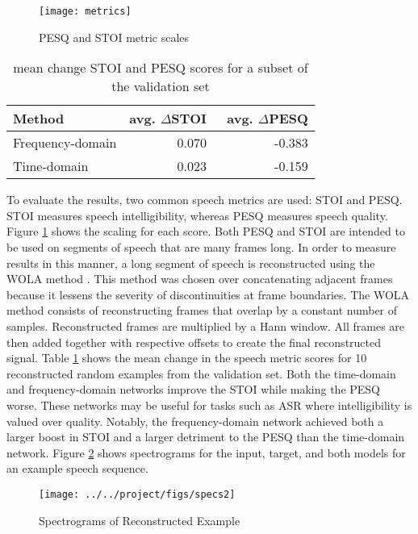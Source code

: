 \begin{figure}
	\centering
	\texttt{[image: metrics]}
	\caption{\ac{PESQ} and \ac{STOI} metric scales}
	\label{fig:metrics}
\end{figure}

\begin{table}
	\centering
	\caption{mean change STOI and PESQ scores for a subset of the validation set}
	\label{tab:results}
	\resizebox{0.5\textwidth}{!} {
	\begin{tabular}{lrr}
	\toprule
			  Method &  avg. $\Delta$STOI &  \ avg. $\Delta$PESQ \\
	\midrule
	Frequency-domain &         0.070 &        -0.383 \\
		 Time-domain &         0.023 &        -0.159 \\
	\bottomrule
	\end{tabular}
	}
\end{table}

To evaluate the results, two common speech metrics are used: \ac{STOI} and \ac{PESQ}. \ac{STOI} measures speech intelligibility, whereas \ac{PESQ} measures speech quality. Figure \ref{fig:metrics} shows the scaling for each score. Both \ac{PESQ} and \ac{STOI} are intended to be used on segments of speech that are many frames long. In order to measure results in this manner, a long segment of speech is reconstructed using the \ac{WOLA} method . This method was chosen over concatenating adjacent frames because it lessens the severity of discontinuities at frame boundaries. The \ac{WOLA} method consists of reconstructing frames that overlap by a constant number of samples. Reconstructed frames are multiplied by a Hann window. All frames are then added together with respective offsets to create the final reconstructed signal. Table \ref{tab:results} shows the mean change in the speech metric scores for 10 reconstructed random  examples from the validation set. Both the time-domain and frequency-domain networks improve the \ac{STOI} while making the \ac{PESQ} worse. These networks may be useful for tasks such as \ac{ASR} where intelligibility is valued over quality. Notably, the frequency-domain network achieved both a larger boost in \ac{STOI} and a larger detriment to the \ac{PESQ} than the time-domain network. Figure \ref{fig:specs} shows spectrograms for the input, target, and both models for an example speech sequence.

\begin{figure}
	\centering
	\texttt{[image: ../../project/figs/specs2]}
	\caption{Spectrograms of Reconstructed Example}
	\label{fig:specs}
\end{figure}
